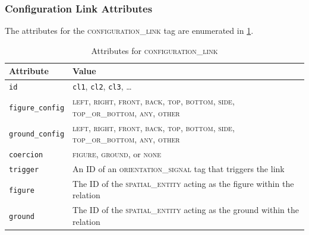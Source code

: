 \documentclass[11pt]{article}
\newenvironment{attributes}
{
\begin{tabular}{|l|l|}
    \hline \textbf{Attribute} & \textbf{Value}\\
}
{   \hline
\end{tabular}
}
\begin{document}


\subsubsection{Configuration Link Attributes} %
\label{ssub:configuration_link_attributes}

The attributes for the \textsc{configuration\_link} tag are enumerated in \cref{tab:configuration_link}. 

\begin{table}[h]
\centering
\begin{attributes}
    \hline \texttt{id}                  & \texttt{cl1}, \texttt{cl2}, 
                                          \texttt{cl3}, \ldots\\
    \hline \texttt{figure\_config}      & \textsc{left}, \textsc{right}, \textsc{front}, \textsc{back}, \textsc{top}, \textsc{bottom}, \textsc{side}, \textsc{top\_or\_bottom}, \textsc{any}, \textsc{other}\\
    \hline \texttt{ground\_config}      & \textsc{left}, \textsc{right}, \textsc{front}, \textsc{back}, \textsc{top}, \textsc{bottom}, \textsc{side}, \textsc{top\_or\_bottom}, \textsc{any}, \textsc{other}\\
    \hline \texttt{coercion}            & \textsc{figure}, \textsc{ground}, or \textsc{none}\\
    \hline \texttt{trigger}             & An ID of an \textsc{orientation\_signal} tag that triggers the link\\
    \hline \texttt{figure}              & The ID of the \textsc{spatial\_entity} acting as the figure within the relation\\
    \hline \texttt{ground}              & The ID of the \textsc{spatial\_entity} acting as the ground within the relation\\
\end{attributes}
\caption{Attributes for \textsc{configuration\_link}}
\label{tab:configuration_link}
\end{table}

\end{document}
